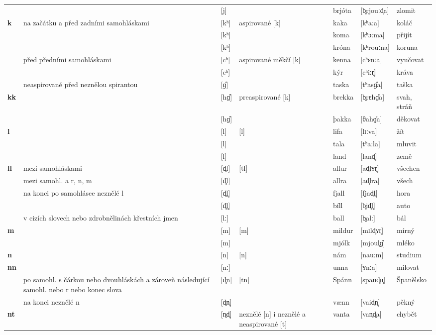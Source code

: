 \begin{longtable}{>{\bfseries}lX>{\IPAfont}lXl>{\IPAfont}ll}
 &  & {[j]} &   & brjóta & {[b̥rjouːd̥a]} & zlomit \\ 
k & na začátku a před zadními samohláskami & {[kʰ]} & aspirované [k] & kaka & {[kʰaːa]} & koláč \\ 
 &  & {[kʰ]} &   & koma & {[kʰɔːma]} & přijít \\ 
 &  & {[kʰ]} &   & króna & {[kʰrouːna]} & koruna \\ 
 & před předními samohláskami & {[cʰ]} & aspirované měkčí [k] & kenna & {[cʰɛnːa]} & vyučovat \\ 
 &  & {[cʰ]} &   & kýr & {[cʰiːr̥]} & kráva \\ 
 & neaspirované před neznělou spirantou & {[ɡ̊]} &   & taska & {[tʰasɡ̊a]} & taška \\ 
kk &  & {[hɡ̊]} & preaspirované [k] & brekka & {[b̥rɛhɡ̊a]} & svah, stráň \\ 
 &  & {[hɡ̊]} &   & þakka & {[θahɡ̊a]} & děkovat \\ 
l &  & {[l]} & [l] & lifa & {[lɪːva]} & žít \\ 
 &  & {[l]} &   & tala & {[tʰaːla]} & mluvit \\ 
 &  & {[l]} &   & land & {[land̥]} & země \\ 
ll & mezi samohláskami & {[d̥l]} & [tl] & allur & {[ad̥lʏr̥]} & všechen \\ 
 & mezi samohl. a r, n, m & {[d̥l]} &   & allra & {[ad̥lra]} & všech \\ 
 & na konci po samohlásce neznělé l & {[d̥l̥]} &   & fjall & {[fjad̥l̥]} & hora \\ 
 &  & {[d̥l̥]} &   & bíll & {[b̥id̥l̥]} & auto \\ 
 & v cizích slovech nebo zdrobnělinách křestních jmen & {[lː]} &  & ball & {[b̥alː]} & bál \\ 
m &  & {[m]} & [m] & mildur & {[mɪld̥ʏr̥]} & mírný \\ 
 &  & {[m]} &   & mjólk & {[mjoul̥ɡ̊]} & mléko \\ 
n &  & {[n]} & [n] & nám & {[nauːm]} & studium \\ 
nn &  & {[nː]} &   & unna & {[ʏnːa]} & milovat \\ 
 & po samohl. s čárkou nebo dvouhláskách a zároveň následující samohl. nebo r nebo konec slova & {[d̥n]} & [tn] & Spánn & {[spaud̥n̥]} & Španělsko \\ 
 & na konci neznělé n & {[d̥n̥]} &   & vænn & {[vaid̥n̥]} & pěkný \\ 
nt &  & {[n̥d̥]} & neznělé [n] i neznělé a neaspirované [t] & vanta & {[van̥d̥a]} & chybět \\ 

\end{longtable}
